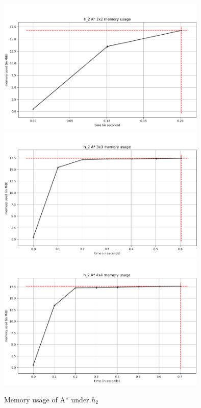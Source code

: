 \documentclass[runningheads]{llncs}
\begin{document}
\begin{figure}
\begin{center}
    \includegraphics[width=10cm]{a_star_h2_2x2.png}
    \includegraphics[width=10cm]{a_star_h2_3x3.png}
    \includegraphics[width=10cm]{a_star_h2_4x4.png}
    \caption{Memory usage of A* under $h_2$} \label{fig4}
\end{center}
\end{figure}
\end{document}
